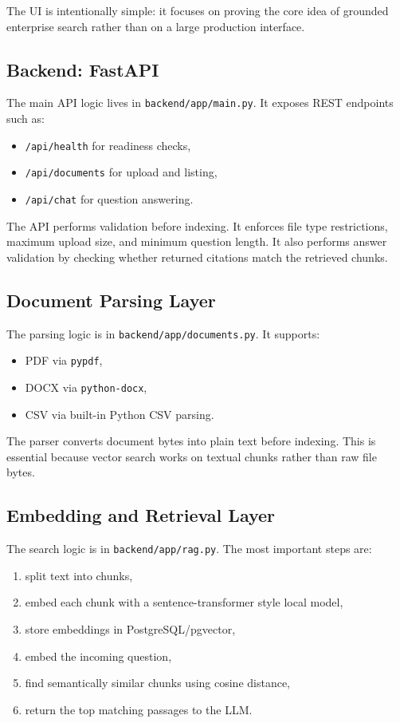 \documentclass[11pt,a4paper]{article}
\begin{document}
The UI is intentionally simple: it focuses on proving the core idea of grounded enterprise search rather than on a large production interface.

\subsection{Backend: FastAPI}
The main API logic lives in \texttt{backend/app/main.py}. It exposes REST endpoints such as:

\begin{itemize}[leftmargin=1.5em]
    \item \texttt{/api/health} for readiness checks,
    \item \texttt{/api/documents} for upload and listing,
    \item \texttt{/api/chat} for question answering.
\end{itemize}

The API performs validation before indexing. It enforces file type restrictions, maximum upload size, and minimum question length. It also performs answer validation by checking whether returned citations match the retrieved chunks.

\subsection{Document Parsing Layer}
The parsing logic is in \texttt{backend/app/documents.py}. It supports:

\begin{itemize}[leftmargin=1.5em]
    \item PDF via \texttt{pypdf},
    \item DOCX via \texttt{python-docx},
    \item CSV via built-in Python CSV parsing.
\end{itemize}

The parser converts document bytes into plain text before indexing. This is essential because vector search works on textual chunks rather than raw file bytes.

\subsection{Embedding and Retrieval Layer}
The search logic is in \texttt{backend/app/rag.py}. The most important steps are:

\begin{enumerate}[leftmargin=2em]
    \item split text into chunks,
    \item embed each chunk with a sentence-transformer style local model,
    \item store embeddings in PostgreSQL/pgvector,
    \item embed the incoming question,
    \item find semantically similar chunks using cosine distance,
    \item return the top matching passages to the LLM.
\end{enumerate}
\end{document}
